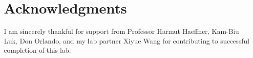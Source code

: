 \documentclass{sigchi}
\begin{document}
\section*{Acknowledgments}
I am sincerely thankful for support from Professor Harmut Haeffner, Kam-Biu Luk, Don Orlando, and my lab partner Xiyue Wang for contributing to successful completion of this lab.




\end{document}
